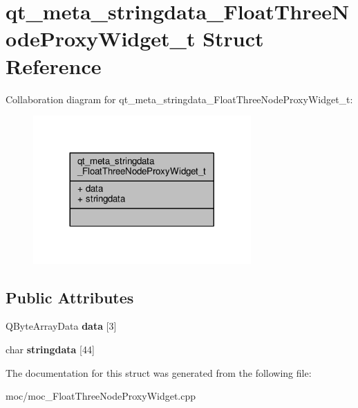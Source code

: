 \hypertarget{structqt__meta__stringdata___float_three_node_proxy_widget__t}{\section{qt\-\_\-meta\-\_\-stringdata\-\_\-\-Float\-Three\-Node\-Proxy\-Widget\-\_\-t Struct Reference}
\label{structqt__meta__stringdata___float_three_node_proxy_widget__t}
}


Collaboration diagram for qt\-\_\-meta\-\_\-stringdata\-\_\-\-Float\-Three\-Node\-Proxy\-Widget\-\_\-t\-:
\nopagebreak
\begin{figure}[H]
\begin{center}
\leavevmode
\includegraphics[width=236pt]{structqt__meta__stringdata___float_three_node_proxy_widget__t__coll__graph}
\end{center}
\end{figure}
\subsection*{Public Attributes}
\begin{DoxyCompactItemize}
\item 
\hypertarget{structqt__meta__stringdata___float_three_node_proxy_widget__t_a66585bc7a86efb06e744aee1e17fff03}{Q\-Byte\-Array\-Data {\bfseries data} \mbox{[}3\mbox{]}}\label{structqt__meta__stringdata___float_three_node_proxy_widget__t_a66585bc7a86efb06e744aee1e17fff03}

\item 
\hypertarget{structqt__meta__stringdata___float_three_node_proxy_widget__t_acd686faef8e42bb5127400cd659b7618}{char {\bfseries stringdata} \mbox{[}44\mbox{]}}\label{structqt__meta__stringdata___float_three_node_proxy_widget__t_acd686faef8e42bb5127400cd659b7618}

\end{DoxyCompactItemize}


The documentation for this struct was generated from the following file\-:\begin{DoxyCompactItemize}
\item 
moc/moc\-\_\-\-Float\-Three\-Node\-Proxy\-Widget.\-cpp\end{DoxyCompactItemize}
